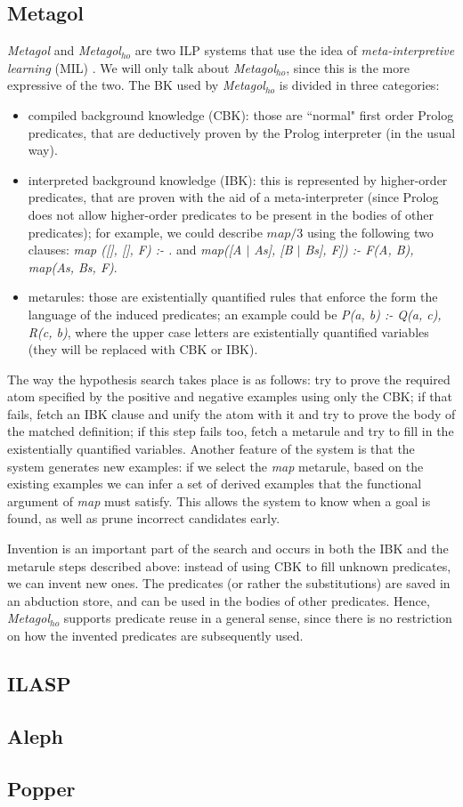 \subsection{Metagol}
\emph{Metagol} and \emph{Metagol$_{ho}$} \cite{metagolho} are two ILP systems that use the idea of \emph{meta-interpretive learning} (MIL) \cite{invabs2016}. We will only talk about \emph{Metagol$_{ho}$}, since this is the more expressive of the two. The BK used by \emph{Metagol$_{ho}$} is divided in three categories:
\begin{itemize}
\item compiled background knowledge (CBK): those are ``normal" first order Prolog predicates, that are deductively proven by the Prolog interpreter (in the usual way).
\item interpreted background knowledge (IBK): this is represented by higher-order predicates, that are proven with the aid of a meta-interpreter (since Prolog does not allow higher-order predicates to be present in the bodies of other predicates); for example, we could describe $map/3$ using the following two clauses:
\textit{map ([], [], F) :- .} and \textit{map([A $\mid$ As], [B $\mid$ Bs], F]) :- F(A, B), map(As, Bs, F)}.
\item metarules: those are existentially quantified rules that enforce the form the language of the induced predicates; an example could be \textit{P(a, b) :- Q(a, c), R(c, b)}, where the upper case letters are existentially quantified variables (they will be replaced with CBK or IBK).
\end{itemize}
The way the hypothesis search takes place is as follows: try to prove the required atom specified by the positive and negative examples using only the CBK; if that fails, fetch an IBK clause and unify the atom with it and try to prove the body of the matched definition; if this step fails too, fetch a metarule and try to fill in the existentially quantified variables. Another feature of the system is that the system generates new examples: if we select the \textit{map} metarule, based on the existing examples we can infer a set of derived examples that the functional argument of \textit{map} must satisfy. This allows the system to know when a goal is found, as well as prune incorrect candidates early.
\par Invention is an important part of the search and occurs in both the IBK and the metarule steps described above: instead of using CBK to fill unknown predicates, we can invent new ones. The predicates (or rather the substitutions) are saved in an abduction store, and can be used in the bodies of other predicates. Hence, \emph{Metagol$_{ho}$} supports predicate reuse in a general sense, since there is no restriction on how the invented predicates are subsequently used.

\subsection{ILASP}

\subsection{Aleph}

\subsection{Popper}
